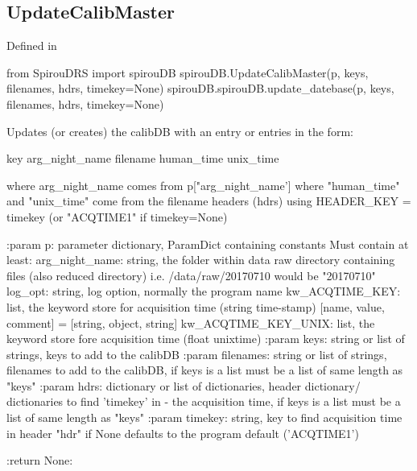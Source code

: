 \noindent\begin{minipage}{\textwidth}
\subsection{UpdateCalibMaster}

Defined in \spirouCDB{}

\begin{pythonbox}
from SpirouDRS import spirouDB
spirouDB.UpdateCalibMaster(p, keys, filenames, hdrs, timekey=None)
spirouDB.spirouDB.update_datebase(p, keys, filenames, hdrs, timekey=None)
\end{pythonbox}

\begin{pythondocstring}
Updates (or creates) the calibDB with an entry or entries in the form:

    {key} {arg_night_name} {filename} {human_time} {unix_time}

where arg_night_name comes from p["arg_night_name']
where "human_time" and "unix_time" come from the filename headers (hdrs)
    using HEADER_KEY = timekey (or "ACQTIME1" if timekey=None)

:param p: parameter dictionary, ParamDict containing constants
    Must contain at least:
            arg_night_name: string, the folder within data raw directory
                            containing files (also reduced directory) i.e.
                            /data/raw/20170710 would be "20170710"
            log_opt: string, log option, normally the program name
            kw_ACQTIME_KEY: list, the keyword store for acquisition time
                            (string time-stamp)
                        [name, value, comment] = [string, object, string]
            kw_ACQTIME_KEY_UNIX: list, the keyword store fore acquisition
                                 time (float unixtime)
:param keys: string or list of strings, keys to add to the calibDB
:param filenames: string or list of strings, filenames to add to the
                  calibDB, if keys is a list must be a list of same length
                  as "keys"
:param hdrs: dictionary or list of dictionaries, header dictionary/
             dictionaries to find 'timekey' in - the acquisition time,
             if keys is a list must be a list of same length  as "keys"
:param timekey: string, key to find acquisition time in header "hdr" if
                None defaults to the program default ('ACQTIME1')

:return None:
\end{pythondocstring}
\end{minipage}

